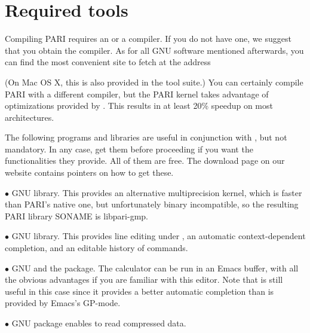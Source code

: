 %
%

\def\tocwrite#1{}
\section{Required tools}

Compiling PARI requires an  or a  compiler. If you do
not have one, we suggest that you obtain the  compiler. As for
all GNU software mentioned afterwards, you can find the most convenient site
to fetch  at the address


\noindent (On Mac OS X, this is also provided in the  tool
suite.) You can certainly compile PARI with a different compiler, but
the PARI kernel takes advantage of optimizations provided by .
This results in at least 20\% speedup on most architectures.

 The following programs and libraries are useful
in conjunction with , but not mandatory. In any case, get them before
proceeding if you want the functionalities they provide. All of them are free.
The download page on our website
 contains pointers on how
to get these.

  $\bullet$ GNU  library. This provides an alternative multiprecision
kernel, which is faster than PARI's native one, but unfortunately binary
incompatible, so the resulting PARI library SONAME is libpari-gmp.

  $\bullet$ GNU  library. This provides line editing under
, an automatic context-dependent completion, and an editable history
of commands.

  $\bullet$ GNU  and the  package. The 
calculator can be run in an Emacs buffer, with all the obvious advantages if
you are familiar with this editor. Note that  is still useful
in this case since it provides a better automatic completion than is provided
by Emacs's GP-mode.

  $\bullet$ GNU  package enables  to read
compressed data.

